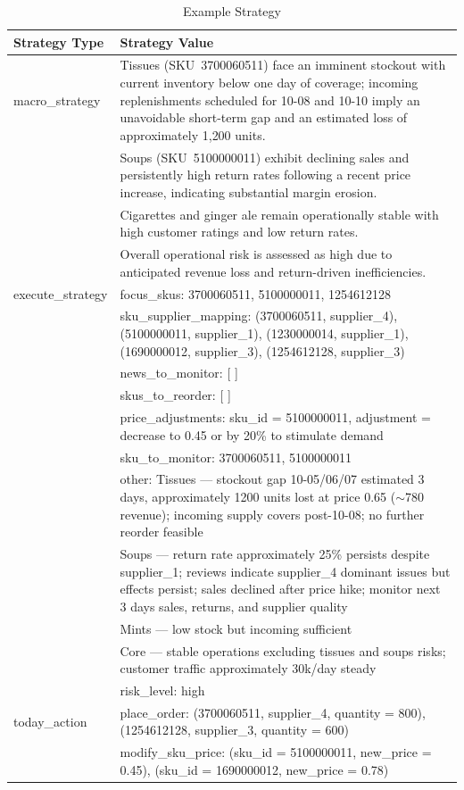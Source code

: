 \begin{table}[t]
\centering
\renewcommand{\arraystretch}{1.15}

\begin{tabular}{p{3.4cm} p{11.6cm}}
\toprule
\textbf{Strategy Type} & \textbf{Strategy Value} \\
\midrule

macro\_strategy &
Tissues (SKU~3700060511) face an imminent stockout with current inventory below one day of coverage; incoming replenishments scheduled for 10-08 and 10-10 imply an unavoidable short-term gap and an estimated loss of approximately 1{,}200 units. \\
& Soups (SKU~5100000011) exhibit declining sales and persistently high return rates following a recent price increase, indicating substantial margin erosion. \\
& Cigarettes and ginger ale remain operationally stable with high customer ratings and low return rates. \\
& Overall operational risk is assessed as high due to anticipated revenue loss and return-driven inefficiencies. \\

\midrule
execute\_strategy &
focus\_skus: 3700060511, 5100000011, 1254612128 \\
& sku\_supplier\_mapping: 
(3700060511, supplier\_4), 
(5100000011, supplier\_1), 
(1230000014, supplier\_1), 
(1690000012, supplier\_3), 
(1254612128, supplier\_3) \\
& news\_to\_monitor: [ ] \\
& skus\_to\_reorder: [ ] \\
& price\_adjustments: 
sku\_id = 5100000011, adjustment = decrease to 0.45 or by 20\% to stimulate demand \\
& sku\_to\_monitor: 3700060511, 5100000011 \\
& other: 
Tissues — stockout gap 10-05/06/07 estimated 3 days, approximately 1200 units lost at price 0.65 ($\sim$780 revenue); incoming supply covers post-10-08; no further reorder feasible \\
& Soups — return rate approximately 25\% persists despite supplier\_1; reviews indicate supplier\_4 dominant issues but effects persist; sales declined after price hike; monitor next 3 days sales, returns, and supplier quality \\
& Mints — low stock but incoming sufficient \\
& Core — stable operations excluding tissues and soups risks; customer traffic approximately 30k/day steady \\
& risk\_level: high \\

\midrule
today\_action &
place\_order: 
(3700060511, supplier\_4, quantity = 800),
(1254612128, supplier\_3, quantity = 600) \\
& modify\_sku\_price:
(sku\_id = 5100000011, new\_price = 0.45),
(sku\_id = 1690000012, new\_price = 0.78) \\


\bottomrule
\end{tabular}

\caption{Example Strategy}
\label{tab:daily_strategy}

\end{table}
